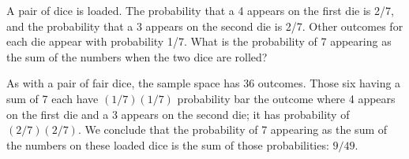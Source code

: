 \documentclass[../main.tex]{subfiles}
\begin{document}
A pair of dice is loaded.
The probability that a 4 appears on the first die is 2/7, and the probability that a 3 appears on the second die is 2/7.
Other outcomes for each die appear with probability 1/7.
What is the probability of 7 appearing as the sum of the numbers when the two dice are rolled?

\solution
As with a pair of fair dice, the sample space has 36 outcomes.
Those six having a sum of 7 each have $(1/7)(1/7)$ probability bar the outcome where 4 appears on the first die and a 3 appears on the second die;
it has probability of $(2/7)(2/7)$.
We conclude that the probability of 7 appearing as the sum of the numbers on these loaded dice is the sum of those probabilities: $9/49$.
\end{document}
